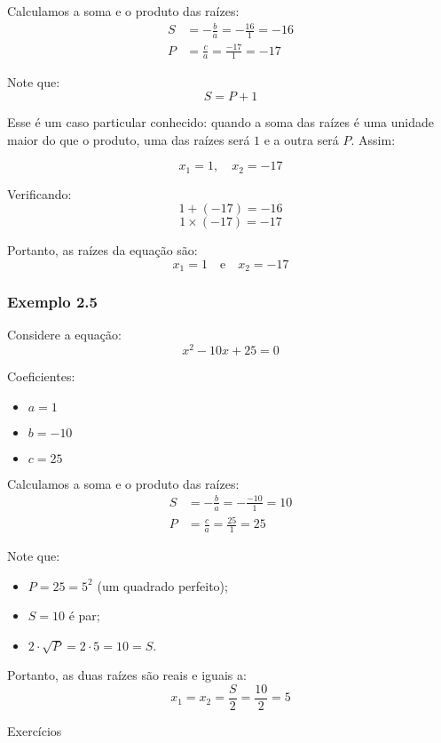 \documentclass[12pt]{report}
\newcommand{\1}{\faThermometerEmpty}
\newcommand{\2}{\faThermometerQuarter}
\newcommand{\3}{\faThermometerHalf}
\newcommand{\4}{\faThermometerThreeQuarters}
\newcommand{\5}{\faThermometerFull}
\begin{document}
Calculamos a soma e o produto das raízes:
\[
\begin{aligned}
    S &= -\frac{b}{a} = -\frac{16}{1} = -16 \\
    P &= \frac{c}{a} = \frac{-17}{1} = -17
\end{aligned}
\]

Note que:
\[
S = P + 1
\]

Esse é um caso particular conhecido: quando a soma das raízes é uma unidade maior do que o produto, uma das raízes será \( 1 \) e a outra será \( P \). Assim:

\[
x_1 = 1, \quad x_2 = -17
\]

Verificando:
$$
1 + (-17) = -16  $$
$$
1 \times (-17) = -17  
$$

Portanto, as raízes da equação são:
\[
x_1 = 1 \quad \text{e} \quad x_2 = -17
\]



\subsubsection*{Exemplo 2.5}

Considere a equação:
$$ x^2 - 10x + 25 = 0 $$

Coeficientes:
\begin{itemize}
    \item $a = 1$
    \item $b = -10$
    \item $c = 25$
\end{itemize}

Calculamos a soma e o produto das raízes:
\[
\begin{aligned}
    S &= -\frac{b}{a} = -\frac{-10}{1} = 10 \\
    P &= \frac{c}{a} = \frac{25}{1} = 25
\end{aligned}
\]

Note que:
\begin{itemize}
    \item $P = 25 = 5^2$ (um quadrado perfeito);
    \item $S = 10$ é par;
    \item $2 \cdot \sqrt{P} = 2 \cdot 5 = 10 = S$.
\end{itemize}

Portanto, as duas raízes são reais e iguais a:
\[
x_1 = x_2 = \frac{S}{2} = \frac{10}{2} = 5
\]




\pagebreak

\begin{center}
{\Large Exercícios}
\end{center}
\end{document}
